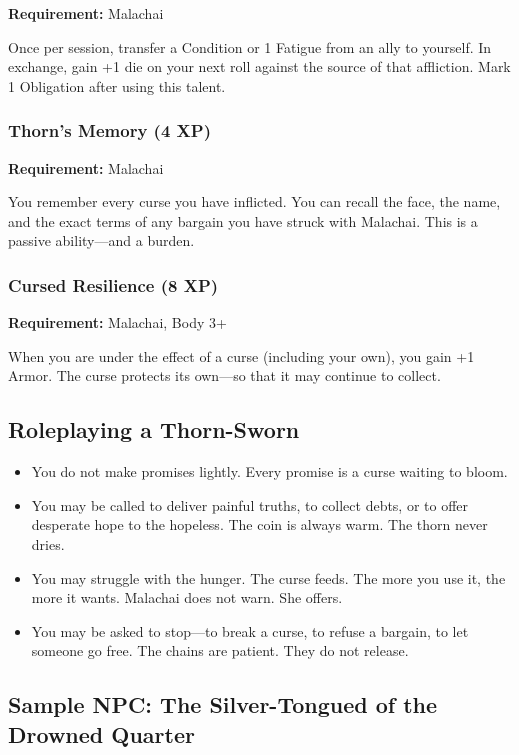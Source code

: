 \textbf{Requirement:} Malachai

Once per session, transfer a Condition or 1 Fatigue from an ally to yourself. In exchange, gain +1 die on your next roll against the source of that affliction. Mark 1 Obligation after using this talent.

\subsubsection{Thorn's Memory (4 XP)}

\textbf{Requirement:} Malachai

You remember every curse you have inflicted. You can recall the face, the name, and the exact terms of any bargain you have struck with Malachai. This is a passive ability—and a burden.

\subsubsection{Cursed Resilience (8 XP)}

\textbf{Requirement:} Malachai, Body 3+

When you are under the effect of a curse (including your own), you gain +1 Armor. The curse protects its own—so that it may continue to collect.

\subsection{Roleplaying a Thorn-Sworn}

\begin{itemize}
\item You do not make promises lightly. Every promise is a curse waiting to bloom.
\item You may be called to deliver painful truths, to collect debts, or to offer desperate hope to the hopeless. The coin is always warm. The thorn never dries.
\item You may struggle with the hunger. The curse feeds. The more you use it, the more it wants. Malachai does not warn. She offers.
\item You may be asked to stop—to break a curse, to refuse a bargain, to let someone go free. The chains are patient. They do not release.
\end{itemize}

\subsection{Sample NPC: The Silver-Tongued of the Drowned Quarter}

